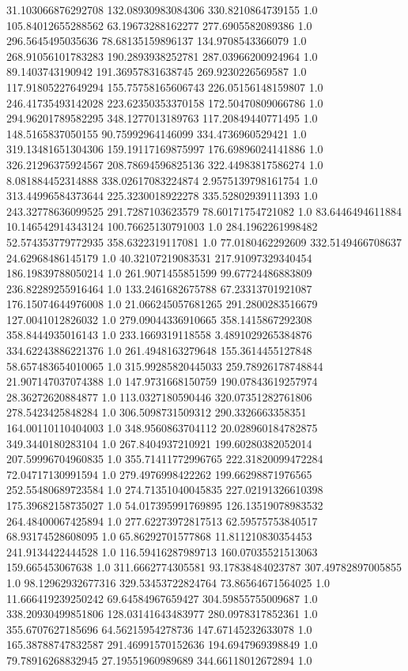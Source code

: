 31.103066876292708	132.08930983084306	330.8210864739155	1.0
105.84012655288562	63.19673288162277	277.6905582089386	1.0
296.5645495035636	78.68135159896137	134.9708543366079	1.0
268.91056101783283	190.2893938252781	287.03966200924964	1.0
89.1403743190942	191.36957831638745	269.9230226569587	1.0
117.91805227649294	155.75758165606743	226.05156148159807	1.0
246.41735493142028	223.62350353370158	172.50470809066786	1.0
294.96201789582295	348.1277013189763	117.20849440771495	1.0
148.5165837050155	90.75992964146099	334.4736960529421	1.0
319.13481651304306	159.19117169875997	176.69896024141886	1.0
326.21296375924567	208.78694596825136	322.44983817586274	1.0
8.081884452314888	338.02617083224874	2.9575139798161754	1.0
313.44996584373644	225.3230018922278	335.52802939111393	1.0
243.32778636099525	291.7287103623579	78.60171754721082	1.0
83.6446494611884	10.146542914343124	100.76625130791003	1.0
284.1962261998482	52.574353779772935	358.6322319117081	1.0
77.0180462292609	332.5149466708637	24.62968486145179	1.0
40.32107219083531	217.91097329340454	186.19839788050214	1.0
261.9071455851599	99.67724486883809	236.82289255916464	1.0
133.2461682675788	67.23313701921087	176.15074644976008	1.0
21.066245057681265	291.2800283516679	127.0041012826032	1.0
279.09044336910665	358.1415867292308	358.8444935016143	1.0
233.1669319118558	3.4891029265384876	334.62243886221376	1.0
261.4948163279648	155.3614455127848	58.657483654010065	1.0
315.99285820445033	259.78926178748844	21.907147037074388	1.0
147.9731668150759	190.07843619257974	28.36272620884877	1.0
113.0327180590446	320.07351282761806	278.5423425848284	1.0
306.5098731509312	290.3326663358351	164.00110110404003	1.0
348.9560863704112	20.028960184782875	349.3440180283104	1.0
267.8404937210921	199.60280382052014	207.59996704960835	1.0
355.71411772996765	222.31820099472284	72.04717130991594	1.0
279.4976998422262	199.66298871976565	252.55480689723584	1.0
274.71351040045835	227.02191326610398	175.39682158735027	1.0
54.017395991769895	126.13519078983532	264.48400067425894	1.0
277.62273972817513	62.59575753840517	68.93174528608095	1.0
65.86292701577868	11.811210830354453	241.9134422444528	1.0
116.59416287989713	160.07035521513063	159.665453067638	1.0
311.6662774305581	93.17838484023787	307.49782897005855	1.0
98.12962932677316	329.53453722824764	73.86564671564025	1.0
11.666419239250242	69.64584967659427	304.59855755009687	1.0
338.20930499851806	128.03141643483977	280.0978317852361	1.0
355.6707627185696	64.56215954278736	147.67145232633078	1.0
165.38788747832587	291.46991570152636	194.6947969398849	1.0
79.78916268832945	27.19551960989689	344.66118012672894	1.0
